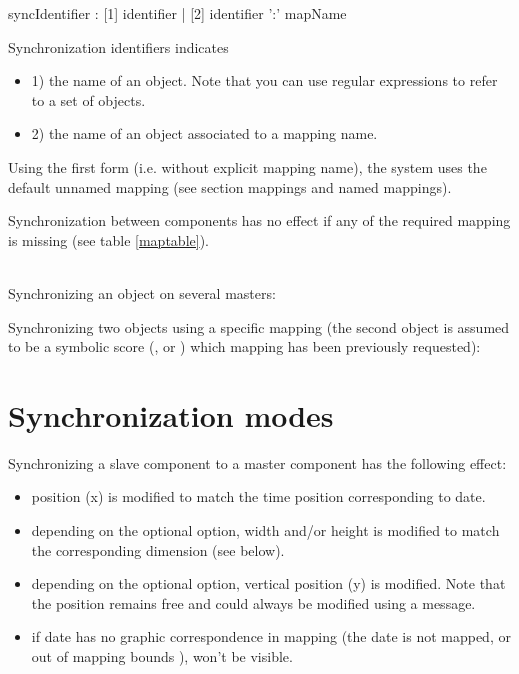 \documentclass[a4paper,twoside]{report}
\newcommand{\sublevel}[1]	{\section{#1}}
\begin{document}

\begin{rail}
syncIdentifier : [1] identifier 
		| [2] identifier ':' mapName
\end{rail}

Synchronization identifiers indicates 
\begin{itemize}
\item 1) the name of an object. Note that you can use regular expressions to refer to a set of objects.
\item 2) the name of an object associated to a mapping name. 
\end{itemize}
Using the first form (i.e. without explicit mapping name), the system uses the default unnamed mapping (see section  mappings and named mappings).

Synchronization between components has no effect if any of the required mapping is missing (see table \ref{maptable}).

\example \\
Synchronizing an object on several masters:

Synchronizing two objects using a specific mapping (the second object is assumed to be a symbolic score (,  or ) which  mapping has been previously requested):

\sublevel{Synchronization modes}
\label{syncmode}

Synchronizing a slave component  to a master component  has the following effect:
\begin{itemize}
\item {} position (x) is modified to match the  time position corresponding to  date.
\item depending on the optional  option,  width and/or height is modified to match the  corresponding  dimension (see below).
\item depending on the optional  option,  vertical position (y) is modified. Note that the  position remains free and could always be modified using a  message.
\item if  date has no graphic correspondence in  mapping (the date is not mapped, or out of  mapping bounds ),  won't be visible.
\end{itemize}
\end{document}
